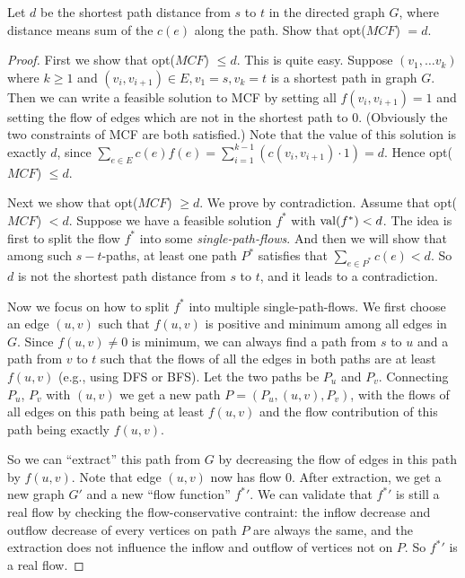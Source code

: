     \newpage
    
    \begin{thm}{}{}
        Let $d$ be the shortest path distance from $s$ to $t$ in the directed graph $G$, where distance means sum of the $c(e)$ along the path. Show that opt($MCF$) $= d$.
    \end{thm}
    
    \begin{proof}
        First we show that opt($MCF$) $\leqslant d$. This is quite easy. Suppose $(v_1, \ldots v_k)$ where $k \geqslant 1$ and $(v_i, v_{i + 1}) \in E, v_1 = s, v_k = t$ is a shortest path in graph $G$. Then we can write a feasible solution to MCF by setting all $f(v_i, v_{i + 1}) = 1$ and setting the flow of edges which are not in the shortest path to $0$. (Obviously the two constraints of MCF are both satisfied.) Note that the value of this solution is exactly $d$, since $\sum_{e \in E} c(e) f(e) = \sum_{i = 1}^{k - 1} (c(v_i, v_{i + 1}) \cdot 1) = d$. Hence opt($MCF$) $\leqslant d$.
        
        Next we show that opt($MCF$) $\geqslant d$. We prove by contradiction. Assume that opt($MCF$) $< d$. Suppose we have a feasible solution $f^*$ with ${\rm val}(f^*) < d$. The idea is first to split the flow $f^*$ into some {\it single-path-flows}. And then we will show that among such $s-t$-paths, at least one path $P^*$ satisfies that $\sum_{e \in P^*} c(e) < d$. So $d$ is not the shortest path distance from $s$ to $t$, and it leads to a contradiction.
        
        \bigskip
        
        Now we focus on how to split $f^*$ into multiple single-path-flows. We first choose an edge $(u, v)$ such that $f(u, v)$ is positive and minimum among all edges in $G$. Since $f(u, v) \neq 0$ is minimum, we can always find a path from $s$ to $u$ and a path from $v$ to $t$ such that the flows of all the edges in both paths are at least $f(u, v)$ (e.g., using DFS or BFS). Let the two paths be $P_u$ and $P_v$. Connecting $P_u$, $P_v$ with $(u, v)$ we get a new path $P = \left(P_u, (u, v), P_v\right)$, with the flows of all edges on this path being at least $f(u, v)$ and the flow contribution of this path being exactly $f(u, v)$.
        
        So we can ``extract'' this path from $G$ by decreasing the flow of edges in this path by $f(u, v)$. Note that edge $(u, v)$ now has flow $0$. After extraction, we get a new graph $G'$ and a new ``flow function'' ${f^*}'$. We can validate that ${f^*}'$ is still a real flow by checking the flow-conservative contraint: the inflow decrease and outflow decrease of every vertices on path $P$ are always the same, and the extraction does not influence the inflow and outflow of vertices not on $P$. So ${f^*}'$ is a real flow.
        

\end{proof}
